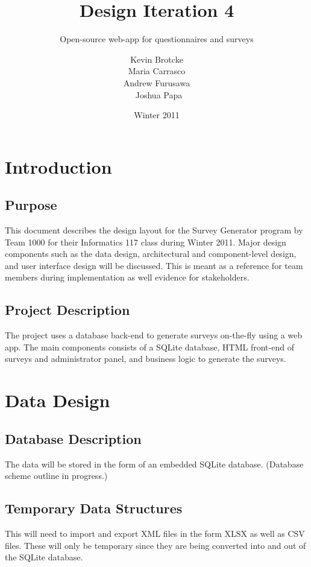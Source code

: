 \documentclass[a4paper,12pt,oneside]{report}
\title{Design Iteration 4}
\subtitle{Open-source web-app for questionnaires and surveys}
\date{Winter 2011}
\author{Kevin Brotcke\\
Maria Carrasco\\
Andrew Furusawa\\\
Joshua Papa }
\begin{document}
   
\renewcommand{\contentsname}{Contents}
\renewcommand{\bibname}{Bibliography}
\renewcommand{\caption}{{\bf Caption : }}

\raskolnikovmaketitle
\tableofcontents

\chapter{Introduction}

\section{ Purpose}

This document describes the design layout for the Survey Generator program by Team 1000 for their Informatics 117 class during Winter 2011. Major design components such as the data design, architectural and component-level design, and user interface design will be discussed. This is meant as a reference for team members during implementation as well evidence for stakeholders.
\section{ Project Description}

        The project uses a database back-end to generate surveys on-the-fly using a web app. The main components consists of a SQLite database, HTML front-end of surveys and administrator panel, and business logic to generate the surveys.
\chapter{ Data Design}
\section{ Database Description}

        The data will be stored in the form of an embedded SQLite database. (Database scheme outline in progress.)
\section{ Temporary Data Structures}

This will need to import and export XML files in the form XLSX as well as CSV files. These will
only be temporary since they are being converted into and out of the SQLite database.
\end{document}
